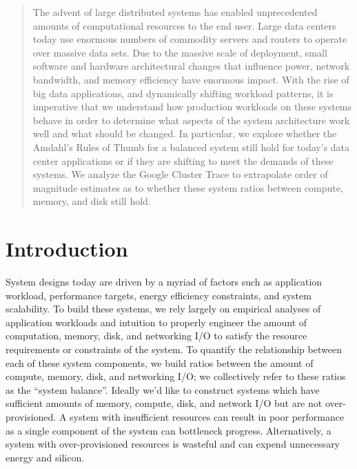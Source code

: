 \documentclass{sig-alternate}
\begin{document}
\maketitle
\begin{abstract}

The advent of large distributed systems has enabled unprecedented amounts of computational resources to the end user.
Large data centers today use enormous numbers of commodity servers and routers to operate over massive data sets.
Due to the massive scale of deployment, small software and hardware architectural changes that influence power, network bandwidth, and memory efficiency have enormous impact.
With the rise of big data applications, and dynamically shifting workload patterns, it is imperative that we understand how production workloads on these systems behave in order to determine what aspects of the system architecture work well and what should be changed.
In particular, we explore whether the Amdahl's Rules of Thumb for a balanced system still hold for today's data center applications or if they are shifting to meet the demands of these systems.
We analyze the Google Cluster Trace to extrapolate order of magnitude estimates as to whether these system ratios between compute, memory, and disk still hold.

\end{abstract}




\section{Introduction}

System designs today are driven by a myriad of factors such as application workload, performance targets, energy efficiency constraints, and system scalability.
To build these systems, we rely largely on empirical analyses of application workloads and intuition to properly engineer the amount of computation, memory, disk, and networking I/O to satisfy the resource requirements or constraints of the system.
To quantify the relationship between each of these system components, we build ratios between the amount of compute, memory, disk, and networking I/O; we collectively refer to these ratios as the ``system balance''.
Ideally we'd like to construct systems which have sufficient amounts of memory, compute, disk, and network I/O but are not over-provisioned.
A system with insufficient resources can result in poor performance as a single component of the system can bottleneck progress.
Alternatively, a system with over-provisioned resources is wasteful and can expend unnecessary energy and silicon.
\end{document}
